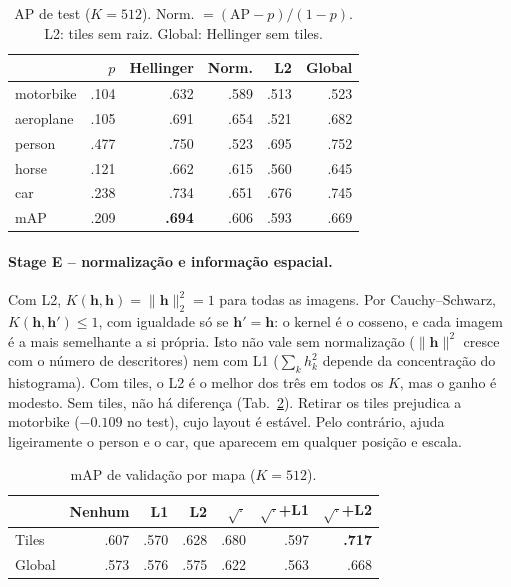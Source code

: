 \begin{table}[t]
\centering
\caption{AP de test ($K=512$). Norm. $=(\text{AP}-p)/(1-p)$. L2: tiles sem
raiz. Global: Hellinger sem tiles.}
\label{tab:part1-test}
\small
\setlength{\tabcolsep}{3.5pt}
\begin{tabular}{lrrrrr}
\toprule
 & $p$ & Hellinger & Norm. & L2 & Global \\
\midrule
motorbike & .104 & .632 & .589 & .513 & .523 \\
aeroplane & .105 & .691 & .654 & .521 & .682 \\
person    & .477 & .750 & .523 & .695 & .752 \\
horse     & .121 & .662 & .615 & .560 & .645 \\
car       & .238 & .734 & .651 & .676 & .745 \\
\midrule
mAP       & .209 & \textbf{.694} & .606 & .593 & .669 \\
\bottomrule
\end{tabular}
\end{table}

\paragraph{Stage E -- normalização e informação espacial.}
Com L2, $K(\mathbf h,\mathbf h)=\|\mathbf h\|_2^2=1$ para todas as imagens. Por
Cauchy--Schwarz, $K(\mathbf h,\mathbf h')\le 1$, com igualdade só se
$\mathbf h'=\mathbf h$: o kernel é o cosseno, e cada imagem é a mais semelhante
a si própria. Isto não vale sem normalização ($\|\mathbf h\|^2$ cresce com o
número de descritores) nem com L1 ($\sum_k h_k^2$ depende da concentração do
histograma). Com tiles, o L2 é o melhor dos três em todos os $K$, mas o ganho é
modesto. Sem tiles, não há diferença (Tab.~\ref{tab:part1-norm}). Retirar os
tiles prejudica a motorbike ($-0.109$ no test), cujo layout é estável. Pelo
contrário, ajuda ligeiramente o person e o car, que aparecem em qualquer
posição e escala.

\begin{table}[t]
\centering
\caption{mAP de validação por mapa ($K=512$).}
\label{tab:part1-norm}
\small
\setlength{\tabcolsep}{3.5pt}
\begin{tabular}{lrrrrrr}
\toprule
 & Nenhum & L1 & L2 & $\sqrt{\cdot}$ & $\sqrt{\cdot}$+L1 & $\sqrt{\cdot}$+L2 \\
\midrule
Tiles  & .607 & .570 & .628 & .680 & .597 & \textbf{.717} \\
Global & .573 & .576 & .575 & .622 & .563 & .668 \\
\bottomrule
\end{tabular}
\end{table}

